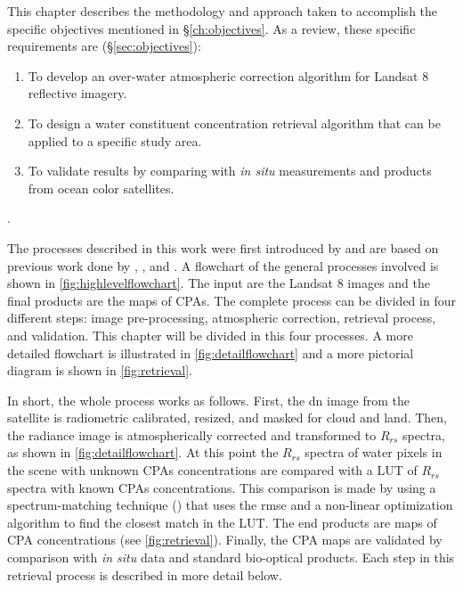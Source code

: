 This chapter describes the methodology and approach taken to accomplish the specific objectives mentioned in \S\ref{ch:objectives}. As a review, these specific requirements are (\S\ref{sec:objectives}):
\begin{enumerate}
  \item To develop an over-water atmospheric correction algorithm for Landsat 8 reflective imagery.
  \item To design a water constituent concentration retrieval algorithm that can be applied to a specific study area.
  \item To validate results by comparing with {\it in situ} measurements and products from ocean color satellites.
\end{enumerate}.

The processes described in this work were first introduced by \cite{Concha2013IGARSS} and are based on previous work done by \cite{Raqueno:2000}, \cite{Gerace:2012}, \cite{Pahlevan:2012b} and \cite{Gerace:2013}. A flowchart of the general processes involved is shown in \autoref{fig:highlevelflowchart}. The input are the Landsat 8 images and the final products are the maps of CPAs. The complete process can be divided in four different steps: image pre-processing, atmospheric correction, retrieval process, and validation. This chapter will be divided in this four processes. A more detailed flowchart is illustrated in \autoref{fig:detailflowchart} and a more pictorial diagram is shown in \autoref{fig:retrieval}.

In short, the whole process works as follows. First, the \gls{dn} image from the satellite is radiometric calibrated, resized, and masked for cloud and land. Then, the radiance image is atmospherically corrected and transformed to $R_{rs}$ spectra, as shown in \autoref{fig:detailflowchart}. At this point the $R_{rs}$ spectra of water pixels in the scene with unknown CPAs concentrations are compared with a LUT of $R_{rs}$ spectra with known CPAs concentrations. This comparison is made by using a spectrum-matching technique (\cite{Raqueno:2000,Mobley:2005}) that uses the \gls{rmse} and a non-linear optimization algorithm to find the closest match in the LUT. The end products are maps of CPA concentrations (see \autoref{fig:retrieval}). Finally, the CPA maps are validated by comparison with {\it in situ} data and standard bio-optical products. Each step in this retrieval process is described in more detail below.

